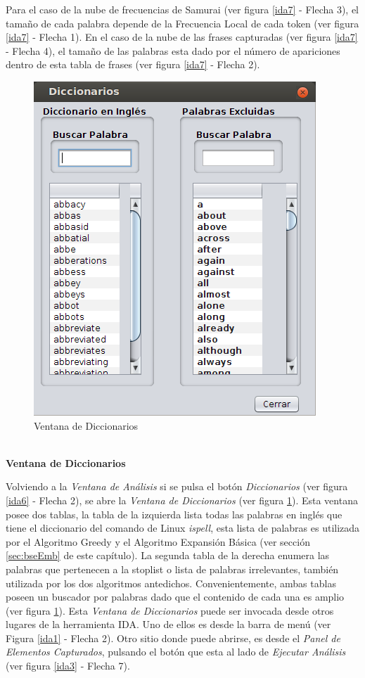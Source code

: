 Para el caso de la nube de frecuencias de Samurai (ver figura \ref{ida7} - Flecha 3), el tamaño de cada palabra depende de la Frecuencia Local de cada token (ver figura \ref{ida7} - Flecha 1). En el caso de la nube de las frases capturadas (ver figura \ref{ida7} - Flecha 4), el tamaño de las palabras esta dado por el número de apariciones dentro de esta tabla de frases (ver figura \ref{ida7} - Flecha 2).

\begin{figure}[t] %
\centerline{%
\includegraphics[scale= 0.58]{./cap4/ida_09.png}
}
\caption{Ventana de Diccionarios}
\label{ida9}
\end{figure}

\noindent \textbf{\\Ventana de Diccionarios\\} 

Volviendo a la \textit{Ventana de Análisis} si se pulsa el botón \textit{Diccionarios} (ver figura \ref{ida6} - Flecha 2), se abre la \textit{Ventana de Diccionarios} (ver figura \ref{ida9}). Esta ventana posee dos tablas, la tabla de la izquierda lista todas las palabras en inglés que tiene el diccionario del comando de Linux \textit{ispell}, esta lista de palabras es utilizada por el Algoritmo Greedy y el Algoritmo Expansión Básica (ver sección \ref{sec:bseEmb} de este capítulo). La segunda tabla de la derecha enumera las palabras que pertenecen a la stoplist o lista de palabras irrelevantes, también utilizada por los dos algoritmos antedichos. Convenientemente, ambas tablas poseen un buscador por palabras dado que el contenido de cada una es amplio (ver figura \ref{ida9}). Esta \textit{Ventana de Diccionarios} puede ser invocada desde otros lugares de la herramienta IDA. Uno de ellos es desde la barra de menú (ver Figura \ref{ida1} - Flecha 2). Otro sitio donde puede abrirse, es desde el \textit{Panel de Elementos Capturados}, pulsando el botón que esta al lado de \textit{Ejecutar Análisis} (ver figura \ref{ida3} - Flecha 7).

